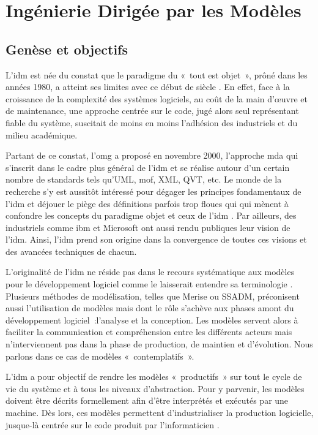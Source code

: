 \chapter{Ingénierie Dirigée par les Modèles}
\label{ch:IDM}
 

\section{Genèse et objectifs}

L'\gls{idm} est née du constat que le paradigme du «~tout est objet~», prôné dans les années 1980, a atteint ses limites avec ce début de siècle \cite{greenfield2004software}. En effet, face à la croissance de la complexité des systèmes logiciels, au coût de la main d'œuvre et de maintenance, une approche centrée sur le code, jugé alors seul représentant 
fiable du système, suscitait de moins en moins l'adhésion des industriels et du 
milieu académique. 

Partant de ce constat, l'\gls{omg} a proposé en novembre 
2000, l'approche \gls{mda} qui s'inscrit dans le cadre 
plus général de l'\gls{idm} et se réalise autour d'un certain nombre de standards tels 
qu'UML, \gls{mof}, XML, QVT, etc. Le monde de la recherche s'y est aussitôt intéressé 
pour dégager les principes fondamentaux de l'\gls{idm} 
\cite{bezivin2001towards}\cite{kent2002model} \cite{de2002using} et déjouer le 
piège des définitions parfois trop floues qui qui mènent à confondre les 
concepts du paradigme objet et ceux de l'\gls{idm} \cite{bezivin2004search}. Par 
ailleurs, des industriels comme \gls{ibm} \cite{booch2004mda} et Microsoft 
\cite{greenfield2004software} ont aussi rendu publiques leur vision de l'\gls{idm}. 
Ainsi, l'\gls{idm} prend son origine dans la convergence de toutes ces visions et des 
avancées techniques de chacun.

L'originalité de l'\gls{idm} ne réside pas dans le recours systématique aux modèles 
pour le développement logiciel comme le laisserait entendre sa terminologie  
\cite{bezivin2004rapport}. Plusieurs méthodes de modélisation, telles que Merise 
ou SSADM, préconisent aussi l'utilisation de modèles mais dont le rôle s'achève aux 
phases amont du développement logiciel~:l'analyse et la conception. Les modèles 
servent alors à faciliter la communication et compréhension entre les différents 
acteurs mais n'interviennent pas dans la phase de production, de maintien et 
d'évolution. Nous parlons dans ce cas de modèles «~contemplatifs~». 

L'\gls{idm} a pour objectif de rendre les modèles «~productifs~» sur tout le cycle de 
vie du système et à tous les niveaux d'abstraction. Pour y parvenir, les modèles 
doivent être décrits formellement afin d'être interprétés et exécutés par une 
machine. Dès lors, ces modèles permettent d'industrialiser la production 
logicielle, jusque-là centrée sur le code produit par l'informaticien 
\cite{bezivin2005unification}.

